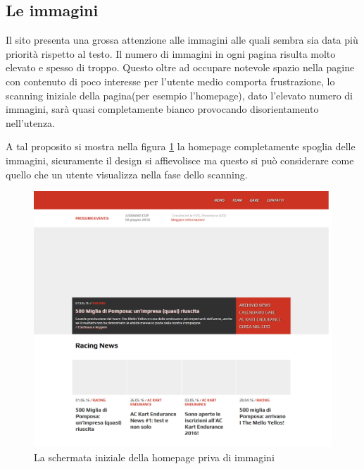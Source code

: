	
	\newpage
	\subsection{Le immagini}
		Il sito presenta una grossa attenzione alle immagini alle quali sembra sia data più priorità rispetto al testo. Il numero di immagini in ogni pagina risulta molto elevato e spesso di troppo. Questo oltre ad occupare notevole spazio nella pagine con contenuto di poco interesse per l'utente medio comporta frustrazione, lo scanning iniziale della pagina(per esempio l'homepage), dato l'elevato numero di immagini, sarà quasi completamente bianco provocando disorientamento nell'utenza.
		
		A tal proposito si mostra nella figura \ref{fig:BlankHomepage1} la homepage completamente spoglia delle immagini, sicuramente il design si affievolisce ma questo si può considerare come quello che un utente visualizza nella fase dello scanning.
		
		\begin{figure} [h]
			\includegraphics[width=\textwidth]{images/BlankHomepage1}
			\caption{La schermata iniziale della homepage priva di immagini}
			\label{fig:BlankHomepage1}
		\end{figure}
		
		
